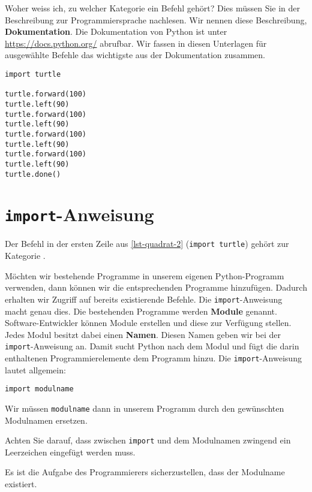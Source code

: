 Woher weiss ich, zu welcher Kategorie ein Befehl gehört? Dies müssen Sie in der Beschreibung zur Programmiersprache nachlesen. Wir nennen diese Beschreibung, \textbf{Dokumentation}. Die Dokumentation von Python ist unter \url{https://docs.python.org/} abrufbar. Wir fassen in diesen Unterlagen für ausgewählte Befehle das wichtigste aus der Dokumentation zusammen.

\begin{lstlisting}[caption={Python-Programm für ein Quadrat.}, label=lst-quadrat-2]
import turtle

turtle.forward(100)
turtle.left(90)
turtle.forward(100)
turtle.left(90)
turtle.forward(100)
turtle.left(90)
turtle.forward(100)
turtle.left(90)
turtle.done()
\end{lstlisting}

\section{\lstinline{import}-Anweisung}

Der Befehl in der ersten Zeile aus \autoref{lst-quadrat-2} (\lstinline{import turtle}) gehört zur Kategorie .

Möchten wir bestehende Programme in unserem eigenen Python-Programm verwenden, dann können wir die entsprechenden Programme hinzufügen. Dadurch erhalten wir Zugriff auf bereits existierende Befehle. Die \lstinline{import}-Anweisung macht genau dies. Die bestehenden Programme werden \textbf{Module} genannt. Software-Entwickler können Module erstellen und diese zur Verfügung stellen. Jedes Modul besitzt dabei einen \textbf{Namen}. Diesen Namen geben wir bei der \lstinline{import}-Anweisung an. Damit sucht Python nach dem Modul und fügt die darin enthaltenen Programmierelemente dem Programm hinzu. Die \lstinline{import}-Anweisung lautet allgemein:

\begin{center}
\lstinline{import modulname}	
\end{center}

Wir müssen \lstinline{modulname} dann in unserem Programm durch den gewünschten Modulnamen ersetzen. 

\begin{important}
Achten Sie darauf, dass zwischen \texttt{import}  und dem Modulnamen zwingend ein Leerzeichen eingefügt werden muss.
\end{important}

Es ist die Aufgabe des Programmierers sicherzustellen, dass der Modulname existiert.

